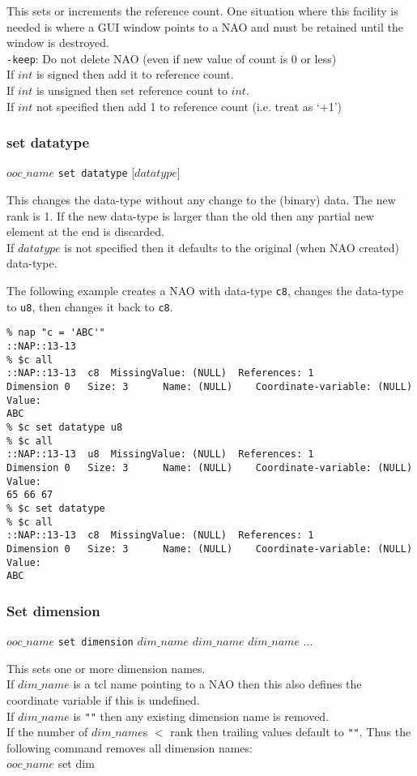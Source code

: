 This sets or increments the reference count. One situation where
  this facility is needed is where a GUI window points to a NAO and
  must be retained until the window is destroyed.
  \\
  \texttt{-keep}: Do not delete NAO (even if new value of count is 0 or less)
  \\
If $int$ is signed then add it to reference count.
  \\
If $int$ is unsigned then set reference count to $int$.
  \\
If $int$ not specified then add 1 to reference count (i.e.  treat as `+1')

\subsubsection{set datatype}
    \label{ooc-modify-set-datatype}

  $ooc\_name$ \texttt{set datatype} [$datatype$]

This changes the data-type without any change to the (binary) data.
The new rank is 1.
If the new data-type is larger than the old then any partial new element at the end is discarded.
  \\
If $datatype$ is not specified then it defaults to the original (when NAO created) data-type.

The following example creates a NAO with 
data-type \texttt{c8},
changes the data-type to \texttt{u8},
then changes it back to \texttt{c8}.
  \begin{verbatim}
% nap "c = 'ABC'"
::NAP::13-13
% $c all
::NAP::13-13  c8  MissingValue: (NULL)  References: 1
Dimension 0   Size: 3      Name: (NULL)    Coordinate-variable: (NULL)
Value:
ABC
% $c set datatype u8
% $c all
::NAP::13-13  u8  MissingValue: (NULL)  References: 1
Dimension 0   Size: 3      Name: (NULL)    Coordinate-variable: (NULL)
Value:
65 66 67
% $c set datatype
% $c all
::NAP::13-13  c8  MissingValue: (NULL)  References: 1
Dimension 0   Size: 3      Name: (NULL)    Coordinate-variable: (NULL)
Value:
ABC
\end{verbatim}

\subsubsection{Set dimension}
    \label{ooc-modify-set-dimension}

  $ooc\_name$ 
  \texttt{set dimension} 
  $dim\_name$ 
  $dim\_name$ 
  $dim\_name$ $\ldots$

This sets one or more dimension names.
  \\If 
  $dim\_name$ is a tcl name pointing to a NAO then this also
  defines the coordinate variable if this is undefined.
  \\If 
  $dim\_name$ is 
  \texttt{""} then any existing dimension name is
  removed.
  \\If the number of 
  $dim\_name$s $<$ rank then trailing values default to 
  \texttt{""}. Thus the following command removes all
  dimension names:
\\
$ooc\_name$ set dim

